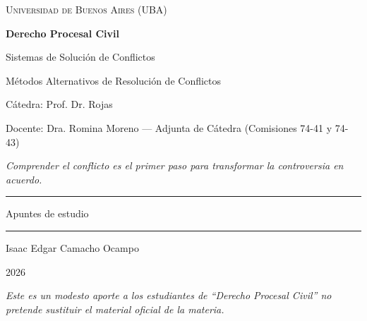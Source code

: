 \documentclass[12pt,oneside]{book}
\newcommand{\universidad}{Universidad de Buenos Aires (UBA)}
\newcommand{\materia}{Derecho Procesal Civil}
\newcommand{\titulo}{Sistemas de Solución de Conflictos}
\newcommand{\subtitulo}{Métodos Alternativos de Resolución de Conflictos}
\newcommand{\catedra}{Cátedra: Prof. Dr. Rojas}
\newcommand{\docenteclase}{Docente: Dra. Romina Moreno --- Adjunta de Cátedra (Comisiones 74-41 y 74-43)}
\newcommand{\autor}{Isaac Edgar Camacho Ocampo}
\newcommand{\anio}{2026}
\newcommand{\reflexionportada}{Comprender el conflicto es el primer paso para transformar la controversia en acuerdo.}
\begin{document}
\frontmatter

\begin{titlepage}

\thispagestyle{empty}

\begin{center}

\vspace*{1cm}

{\large \textsc{\universidad}}

\vspace{3cm}

{\Huge \textbf{\materia}}

\vspace{1cm}

{\LARGE \titulo}

\vspace{0.3cm}

{\large \subtitulo}

\vspace{0.6cm}

{\normalsize \catedra}

\vspace{0.2cm}

{\normalsize \docenteclase}

\vspace{0.8cm}

\textit{\reflexionportada}

\vspace{1.2cm}

\rule{0.70\textwidth}{0.5pt}

\vspace{0.5cm}

{\large Apuntes de estudio}

\vspace{0.5cm}

\rule{0.70\textwidth}{0.5pt}

\vfill

{\large \autor}

\vspace{0.3cm}

{\large \anio}

\end{center}

\vfill

\begin{flushleft}
\textit{Este es un modesto aporte a los estudiantes de ``\materia'' no pretende sustituir el material oficial de la materia.}
\end{flushleft}

\end{titlepage}
\end{document}
